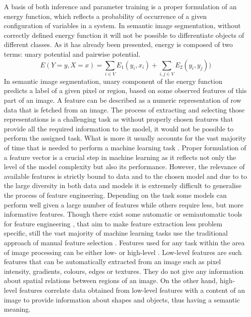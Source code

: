 A basis of both inference and parameter training is a proper formulation of an energy function, which reflects a probability of occurrence of a given configuration of variables in a system. In semantic image segmentation, without correctly defined energy function it will not be possible to differentiate objects of different classes. As it has already been presented, energy is composed of two terms: unary potential and pairwise potential. 
\begin{equation}
    E(Y=y,X=x) = \sum_{i \in V}{E_1(y_i,x_i)} +  \sum_{i,j \in V}{E_2(y_i,y_j)})
\end{equation}
In semantic image segmentation, unary component of the energy function predicts a label of a given pixel or region, based on some observed features of this part of an image. A feature can be described as a numeric representation of row data that is fetched from an image. The process of extracting and selecting those representations is a challenging task as without properly chosen features that provide all the required information to the model, it would not be possible to perform the assigned task. What is more it usually accounts for the vast majority of time that is needed to perform a machine learning task \cite{features_oreilly}. Proper formulation of a feature vector is a crucial step in machine learning as it reflects not only the level of the model complexity but also its performance. However, the relevance of available features is strictly bound to data and to the chosen model and due to to the large diversity in both data and models it is extremely difficult to generalise the process of feature engineering. Depending on the task some models can perform well given a large number of features while others require less, but more informative features. Though there exist some automatic or semiautomatic tools for feature engineering \cite{python_h2o, python_tpot, python_auto-sklearn}, that aim to make feature extraction less problem specific, still the vast majority of machine learning tasks use the traditional approach of manual feature selection \cite{feature_engineering}. 
Features used for any task within the area of image processing can be either low- or high-level \cite{feature_extraction_book}. Low-level features are such features that can be automatically extracted from an image such as pixel intensity, gradients, colours, edges or textures. They do not give any information about spatial relations between regions of an image. On the other hand, high-level features correlate data obtained from low-level features with a content of an image to provide information about shapes and objects, thus having a semantic meaning. 
